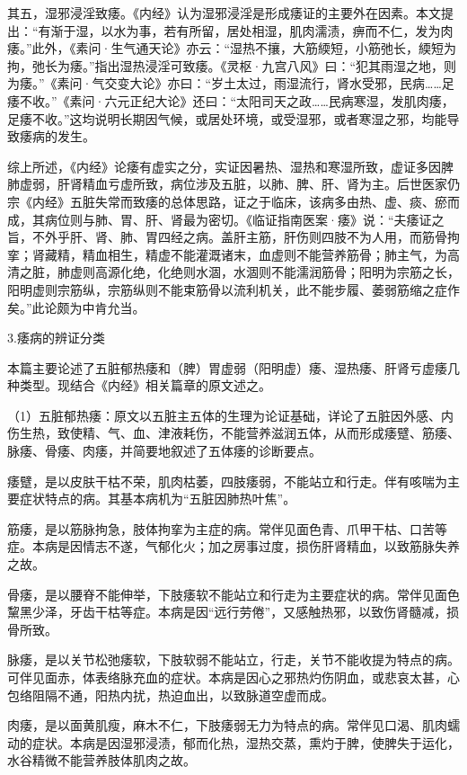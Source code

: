 \documentclass[draft,12pt]{ctexbook}
\begin{document}
其五，湿邪浸淫致痿。《内经》认为湿邪浸淫是形成痿证的主要外在因素。本文提出：“有渐于湿，以水为事，若有所留，居处相湿，肌肉濡渍，痹而不仁，发为肉痿。”此外，《素问·生气通天论》亦云：“湿热不攘，大筋緛短，小筋弛长，緛短为拘，弛长为痿。”指出湿热浸淫可致痿。《灵枢·九宫八风》曰：“犯其雨湿之地，则为痿。”《素问·气交变大论》亦曰：“岁土太过，雨湿流行，肾水受邪，民病……足痿不收。”《素问·六元正纪大论》还曰：“太阳司天之政……民病寒湿，发肌肉痿，足痿不收。”这均说明长期因气候，或居处环境，或受湿邪，或者寒湿之邪，均能导致痿病的发生。

综上所述，《内经》论痿有虚实之分，实证因暑热、湿热和寒湿所致，虚证多因脾肺虚弱，肝肾精血亏虚所致，病位涉及五脏，以肺、脾、肝、肾为主。后世医家仍宗《内经》五脏失常而致痿的总体思路，证之于临床，该病多由热、虚、痰、瘀而成，其病位则与肺、胃、肝、肾最为密切。《临证指南医案·痿》说：“夫痿证之旨，不外乎肝、肾、肺、胃四经之病。盖肝主筋，肝伤则四肢不为人用，而筋骨拘挛；肾藏精，精血相生，精虚不能灌溉诸末，血虚则不能营养筋骨；肺主气，为高清之脏，肺虚则高源化绝，化绝则水涸，水涸则不能濡润筋骨；阳明为宗筋之长，阳明虚则宗筋纵，宗筋纵则不能束筋骨以流利机关，此不能步履、萎弱筋缩之症作矣。”此论颇为中肯允当。

3.痿病的辨证分类

本篇主要论述了五脏郁热痿和（脾）胃虚弱（阳明虚）痿、湿热痿、肝肾亏虚痿几种类型。现结合《内经》相关篇章的原文述之。

（1）五脏郁热痿：原文以五脏主五体的生理为论证基础，详论了五脏因外感、内伤生热，致使精、气、血、津液耗伤，不能营养滋润五体，从而形成痿躄、筋痿、脉痿、骨痿、肉痿，并简要地叙述了五体痿的诊断要点。

痿躄，是以皮肤干枯不荣，肌肉枯萎，四肢痿弱，不能站立和行走。伴有咳喘为主要症状特点的病。其基本病机为“五脏因肺热叶焦”。

筋痿，是以筋脉拘急，肢体拘挛为主症的病。常伴见面色青、爪甲干枯、口苦等症。本病是因情志不遂，气郁化火；加之房事过度，损伤肝肾精血，以致筋脉失养之故。

骨痿，是以腰脊不能伸举，下肢痿软不能站立和行走为主要症状的病。常伴见面色黧黑少泽，牙齿干枯等症。本病是因“远行劳倦”，又感触热邪，以致伤肾髓减，损骨所致。

脉痿，是以关节松弛痿软，下肢软弱不能站立，行走，关节不能收提为特点的病。可伴见面赤，体表络脉充血的症状。本病是因心之邪热灼伤阴血，或悲哀太甚，心包络阻隔不通，阳热内扰，热迫血出，以致脉道空虚而成。

肉痿，是以面黄肌瘦，麻木不仁，下肢痿弱无力为特点的病。常伴见口渴、肌肉蠕动的症状。本病是因湿邪浸渍，郁而化热，湿热交蒸，熏灼于脾，使脾失于运化，水谷精微不能营养肢体肌肉之故。
\end{document}
